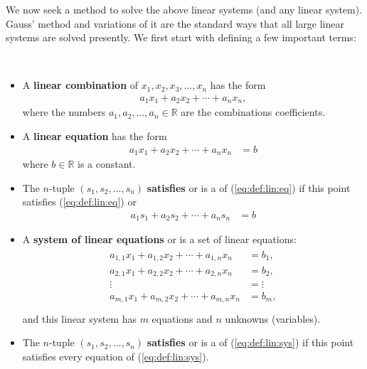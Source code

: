 We now seek a method to solve the above linear systems (and any linear system).  Gauss' method and variations of it are the standard ways that all large linear systems are solved presently.   We first start with defining a few important terms:
\begin{definition}  ~

\begin{itemize}
\item
A \textbf{linear combination} of $x_1, x_2, x_3, \ldots, x_n$ has the form
%
\begin{align*}
a_1 x_1 + a_2 x_2 + \cdots + a_n x_n,
\end{align*}
where the numbers $a_1, a_2, \ldots, a_n \in \mathbb{R}$ are the combinations coefficients.

\item A \textbf{linear equation} has the form
%
\begin{align}
a_1 x_1 + a_2 x_2 + \cdots + a_n x_n & = b
\label{eq:def:lin:eq}
\end{align}
where $b \in \mathbb{R}$ is a constant.
\item The $n$-tuple $(s_1,s_2,\ldots,s_n)$ \textbf{satisfies} or is a  of (\ref{eq:def:lin:eq}) if this point satisfies (\ref{eq:def:lin:eq}) or
%
\begin{align*}
a_1 s_1 + a_2 s_2 + \cdots + a_n s_n & = b
\end{align*}
\item A \textbf{system of linear equations} or  is a set of linear equations:
%
\begin{align}
\begin{split}
a_{1,1} x_1 + a_{1,2} x_2 + \cdots + a_{1,n} x_n & = b_1 , \\
a_{2,1} x_1 + a_{2,2} x_2 + \cdots + a_{2,n} x_n & = b_2, \\
\vdots & = \vdots \\
a_{m,1} x_1 + a_{m,2} x_2 + \cdots + a_{m,n} x_n & = b_m, \\
\end{split} \label{eq:def:lin:sys}
\end{align}
and this linear system has $m$ equations and $n$ unknowns (variables).
\item The $n$-tuple $(s_1,s_2,\ldots,s_n)$ \textbf{satisfies} or is a  of (\ref{eq:def:lin:sys}) if this point satisfies every equation of (\ref{eq:def:lin:sys}).
\end{itemize}

\end{definition}

